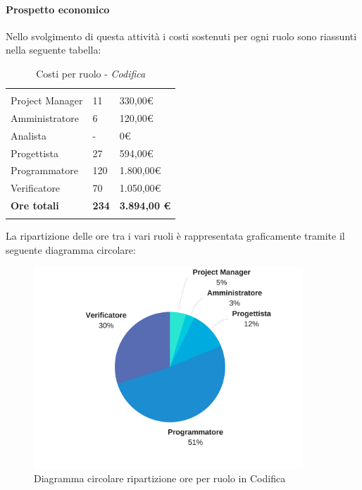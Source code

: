			\paragraph{Prospetto economico} \Spazio
			Nello svolgimento di questa attività i costi sostenuti per ogni ruolo sono riassunti nella seguente tabella:
			\begin{table}[H]
				\centering
				\begin{tabular}{|p{4cm}|C{4cm}|C{4cm}|}
					
					 & &\\
					Project Manager & 11 & 330,00\euro \\
					\hline
					Amministratore& 6 & 120,00\euro \\
					\hline
					Analista & - & 0\euro \\
					\hline
					Progettista & 27 & 594,00\euro \\
					\hline
					Programmatore & 120 & 1.800,00\euro \\
					\hline
					Verificatore & 70 & 1.050,00\euro \\
					\hline
					\textbf{Ore totali} & \textbf{234} & \textbf{3.894,00 \euro} \\
				\end{tabular}
					\caption{Costi per ruolo - \textit{Codifica}}
			\end{table}
			
			La ripartizione delle ore tra i vari ruoli è rappresentata graficamente tramite il seguente diagramma circolare:

		\begin{figure}[H] 
			\centering 
			\includegraphics[width=0.9\textwidth]{images/CircolareCodifica.png} 
			\caption{Diagramma circolare ripartizione ore per ruolo in Codifica}
			\label{CircolareCodifica}
		\end{figure}
	
